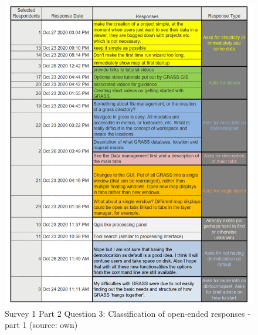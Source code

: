 \documentclass[a4paper,10pt,twoside]{article}
\begin{document}
\newpage
\vspace{0.3cm}
\begin{figure}[hbt!] 
\begin{center}
\includegraphics[width=17cm]{../surveys/analyzed_data/survey1_part2_question3_open_ended-2_2.png} 
\caption[Survey 1 Part 2 Question 3: Classification of open-ended responses - part 1]{Survey 1 Part 2 Question 3: Classification of open-ended responses - part 1 (source: own)}
\label{fig:survey1_part2_question3_open_ended-1_1}
\end{center}
\end{figure}
\end{document}

